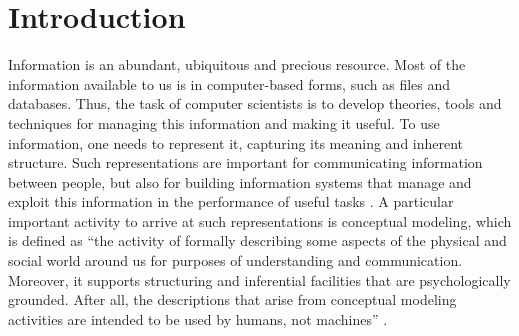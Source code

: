 \documentclass[
	10pt,				%
	oneside,
	a4paper,			%
	brazil,
	english
	]{abntex2}
\begin{document}
\tableofcontents*
\cleardoublepage

\textual

%  



\chapter[Introduction]{Introduction}

Information is an abundant, ubiquitous and precious resource. Most of the information available to us is in computer-based forms, such as files and databases. Thus, the task of computer scientists is to develop theories, tools and techniques for managing this information and making it useful. To use information, one needs to represent it, capturing its meaning and inherent structure. Such representations are important for communicating information between people, but also for building information systems that manage and exploit this information in the performance of useful tasks \cite{mylopoulos98}.
%
A particular important activity to arrive at such representations is conceptual modeling, which is defined as “the activity of formally describing some aspects of the physical and social world around us for purposes of understanding and communication. Moreover, it supports structuring and inferential facilities that are psychologically grounded. After all, the descriptions that arise from conceptual modeling activities are intended to be used by humans, not machines” \cite{mylopoulos92}.
\end{document}
